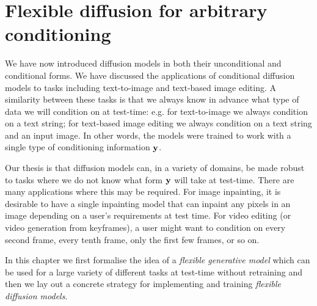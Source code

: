 \chapter{Flexible diffusion for arbitrary conditioning}
\label{ch:flexible-diffusion}



We have now introduced diffusion models in both their unconditional and conditional forms. We have discussed the applications of conditional diffusion models to tasks including text-to-image and text-based image editing. A similarity between these tasks is that we always know in advance what type of data we will condition on at test-time: e.g. for text-to-image we always condition on a text string; for text-based image editing we always condition on a text string and an input image. In other words, the models were trained to work with a single type of conditioning information ${\mathbf{y}}$.

Our thesis is that diffusion models can, in a variety of domains, be made robust to tasks where we do not know what form ${\mathbf{y}}$ will take at test-time. There are many applications where this may be required. For image inpainting, it is desirable to have a single inpainting model that can inpaint any pixels in an image depending on a user's requirements at test time. For video editing (or video generation from keyframes), a user might want to condition on every second frame, every tenth frame, only the first few frames, or so on.


In this chapter we first formalise the idea of a \textit{flexible generative model} which can be used for a large variety of different tasks at test-time without retraining and then we lay out a concrete strategy for implementing and training \textit{flexible diffusion models}.


